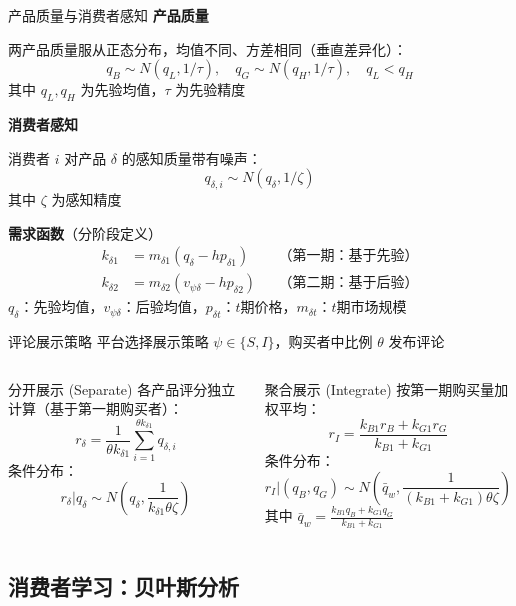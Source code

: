 \documentclass[aspectratio=169,10pt]{beamer}
\newcommand{\HL}[1]{\textcolor{emphasis}{#1}}
\begin{document}
\begin{frame}{产品质量与消费者感知}
\textbf{产品质量}

两产品质量服从正态分布，\HL{均值不同}、方差相同（垂直差异化）：
\[
q_B \sim N(q_L, 1/\tau), \quad q_G \sim N(q_H, 1/\tau), \quad q_L < q_H
\]
其中 $q_L, q_H$ 为先验均值，$\tau$ 为先验精度

\vspace{10pt}
\textbf{消费者感知}

消费者 $i$ 对产品 $\delta$ 的感知质量带有噪声：
\[
q_{\delta,i} \sim N(q_\delta, 1/\zeta)
\]
其中 $\zeta$ 为感知精度

\vspace{10pt}
\textbf{需求函数}（分阶段定义）
\begin{align*}
k_{\delta 1} &= m_{\delta 1}(q_\delta - hp_{\delta 1}) & &\text{（第一期：基于先验）}\\
k_{\delta 2} &= m_{\delta 2}(v_{\psi\delta} - hp_{\delta 2}) & &\text{（第二期：基于后验）}
\end{align*}
$q_\delta$：先验均值，$v_{\psi\delta}$：后验均值，$p_{\delta t}$：$t$期价格，$m_{\delta t}$：$t$期市场规模
\end{frame}

\begin{frame}{评论展示策略}
平台选择展示策略 $\psi \in \{S, I\}$，购买者中比例 $\theta$ 发布评论

\vspace{8pt}
\begin{columns}[T]
\begin{alertblock}{分开展示 (Separate)}
各产品评分独立计算（基于第一期购买者）：
\[
r_\delta = \frac{1}{\theta k_{\delta 1}}\sum_{i=1}^{\theta k_{\delta 1}} q_{\delta,i}
\]
条件分布：
\[
r_\delta|q_\delta \sim N\left(q_\delta, \frac{1}{k_{\delta 1}\theta\zeta}\right)
\]
\end{alertblock}

\begin{exampleblock}{聚合展示 (Integrate)}
按第一期购买量加权平均：
\[
r_I = \frac{k_{B1} r_B + k_{G1} r_G}{k_{B1} + k_{G1}}
\]
条件分布：
\[
r_I|(q_B,q_G) \sim N\left(\bar{q}_w, \frac{1}{(k_{B1}+k_{G1})\theta\zeta}\right)
\]
其中 $\bar{q}_w = \frac{k_{B1} q_B + k_{G1} q_G}{k_{B1} + k_{G1}}$
\end{exampleblock}
\end{columns}
\end{frame}

\subsection{消费者学习：贝叶斯分析}
\end{document}
